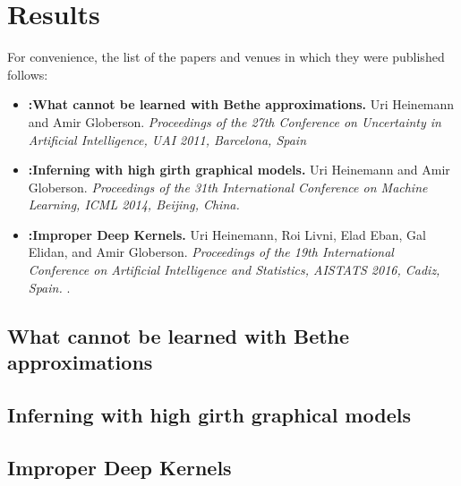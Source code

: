 \chapter{Results}
For convenience, the list of the papers and venues in which they were published follows:

\begin{itemize}
\item 
\textbf{:What cannot be learned with Bethe approximations.}
Uri Heinemann and  Amir Globerson.
\emph{Proceedings of the 27th Conference on Uncertainty in Artificial Intelligence, UAI 2011, Barcelona, Spain}

\item \textbf{:Inferning with high girth graphical models.}
Uri Heinemann and  Amir Globerson.
\emph{Proceedings of the 31th International Conference on Machine Learning, ICML 2014, Beijing, China.}

\item \textbf{:Improper Deep Kernels.}
Uri Heinemann, Roi Livni, Elad Eban, Gal Elidan, and Amir Globerson.
\emph{Proceedings of the 19th International Conference on Artificial Intelligence and Statistics, AISTATS 2016, Cadiz, Spain.} \cite{HLEEG}.

\end{itemize} 


\newpage
\section{What cannot be learned with Bethe approximations}
\label{sec:lwbethe}

\newpage
\section{Inferning with high girth graphical models}
\label{sec:lg}

\newpage
\section{Improper Deep Kernels}
\label{sec:impnet}

